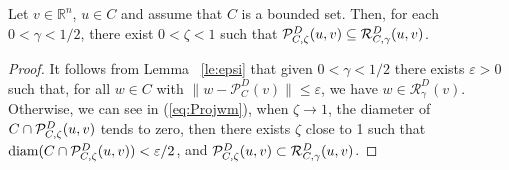 \begin{proposition} \label{le:pcr}
	Let $v \in {\mathbb R}^n$, $u \in C$ and assume that $C$ is a bounded set. Then, for each $0<\gamma < 1/2$,     there exist $0 < \zeta  <1$ such that    ${\cal P}_{C,\zeta}^{D}(u, v)  \subseteq    {\cal R}_{C,\gamma}^{D}(u, v)$.
\end{proposition}
\begin{proof}
	It follows from Lemma~ \ref{le:epsi}  that given $0<\gamma<1/2$ there exists $\varepsilon>0$ such that,  for all $w\in C$  with $\|w-\mathcal{P}_C^D(v)\|\leq \varepsilon$, we have  $w\in\mathcal{R}_\gamma^D(v)$. Otherwise,  we can see in (\ref{eq:Projwm}), when $\zeta\to 1$, the diameter of $C\cap{\cal P}_{C,\zeta}^{D}(u, v)$ tends to zero, then there exists  $\zeta$ close to 1 such that $\mbox{diam}(C\cap{\cal P}_{C,\zeta}^{D}(u, v))<\varepsilon/2$, and ${\cal P}_{C,\zeta}^{D}(u, v) \subset {\cal R}_{C,\gamma}^{D}(u, v)$.
\end{proof}

